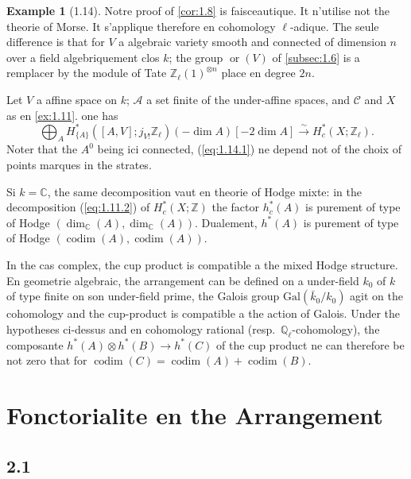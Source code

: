 \documentclass[11pt,a4paper]{article}
\theoremstyle{plain}
\theoremstyle{definition}
\newtheorem{example}[theorem]{Example}
\DeclareMathOperator{\codim}{codim}
\newcommand{\ori}{\operatorname{or}}
\begin{document}
\begin{example}[1.14]\label{ex:1.14}
Notre proof of \ref{cor:1.8} is faisceautique. It n'utilise not the theorie of Morse. It s'applique therefore en cohomology $\ell$-adique. The seule difference is that for $V$ a algebraic variety smooth and connected of dimension $n$ over a field algebriquement clos $k$; the group $\ori(V)$ of \ref{subsec:1.6} is a remplacer by the module of Tate $\mathbb{Z}_\ell(1)^{\otimes n}$ place en degree $2n$.

Let $V$ a affine space on $k$; $\mathcal{A}$ a set finite of the under-affine spaces, and $\mathcal{C}$ and $X$ as en \ref{ex:1.11}. one has
\begin{equation}\label{eq:1.14.1}
\bigoplus_A H^*_{\{A\}}([A,V];j_{V!}\mathbb{Z}_\ell)(-\dim A)[-2\dim A] \xrightarrow{\sim} H^*_c(X;\mathbb{Z}_\ell).
\tag{1.14.1}
\end{equation}
Noter that the $A^0$ being ici connected, (\ref{eq:1.14.1}) ne depend not of the choix of points marques in the strates.

Si $k = \mathbb{C}$, the same decomposition vaut en theorie of Hodge mixte: in the decomposition (\ref{eq:1.11.2}) of $H^*_c(X;\mathbb{Z})$ the factor $h^*_c(A)$ is purement of type of Hodge $(\dim_{\mathbb{C}}(A), \dim_{\mathbb{C}}(A))$. Dualement, $h^*(A)$ is purement of type of Hodge $(\codim(A), \codim(A))$.

In the cas complex, the cup product is compatible a the mixed Hodge structure. En geometrie algebraic, the arrangement can be defined on a under-field $k_0$ of $k$ of type finite on son under-field prime, the Galois group $\mathrm{Gal}(\bar{k}_0/k_0)$ agit on the cohomology and the cup-product is compatible a the action of Galois. Under the hypotheses ci-dessus and en cohomology rational (resp.~$\mathbb{Q}_\ell$-cohomology), the composante $h^*(A) \otimes h^*(B) \to h^*(C)$ of the cup product ne can therefore be not zero that for $\codim(C) = \codim(A) + \codim(B)$.
\end{example}


\section{Fonctorialite en the Arrangement}\label{sec:2}

\subsection{2.1}\label{subsec:2.1}
\end{document}
